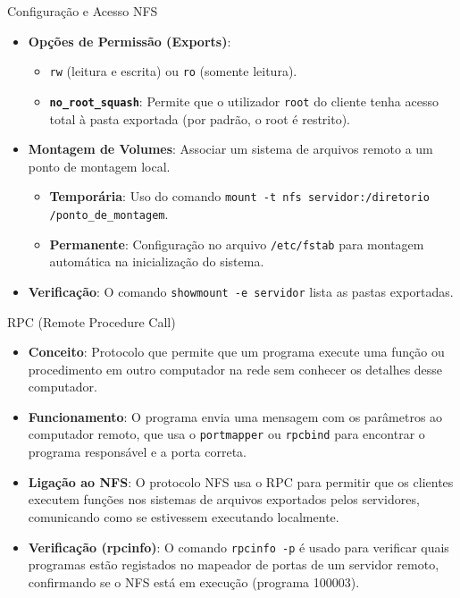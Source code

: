 \documentclass{beamer}
\begin{document}
	\begin{frame}{Configuração e Acesso NFS}
		\begin{itemize}
			\item \textbf{Opções de Permissão (Exports)}:
			\begin{itemize}
				\item \texttt{rw} (leitura e escrita) ou \texttt{ro} (somente leitura).
				\item \textbf{\texttt{no\_root\_squash}}: Permite que o utilizador \texttt{root} do cliente tenha acesso total à pasta exportada (por padrão, o root é restrito).
			\end{itemize}
			\item \textbf{Montagem de Volumes}: Associar um sistema de arquivos remoto a um ponto de montagem local.
			\begin{itemize}
				\item \textbf{Temporária}: Uso do comando \texttt{mount -t nfs servidor:/diretorio /ponto\_de\_montagem}.
				\item \textbf{Permanente}: Configuração no arquivo \texttt{/etc/fstab} para montagem automática na inicialização do sistema.
			\end{itemize}
			\item \textbf{Verificação}: O comando \texttt{showmount -e servidor} lista as pastas exportadas.
		\end{itemize}
	\end{frame}
	
	\begin{frame}{RPC (Remote Procedure Call)}
		\begin{itemize}
			\item \textbf{Conceito}: Protocolo que permite que um programa execute uma função ou procedimento em outro computador na rede sem conhecer os detalhes desse computador.
			\item \textbf{Funcionamento}: O programa envia uma mensagem com os parâmetros ao computador remoto, que usa o \texttt{portmapper} ou \texttt{rpcbind} para encontrar o programa responsável e a porta correta.
			\item \textbf{Ligação ao NFS}: O protocolo NFS usa o RPC para permitir que os clientes executem funções nos sistemas de arquivos exportados pelos servidores, comunicando como se estivessem executando localmente.
			\item \textbf{Verificação (rpcinfo)}: O comando \texttt{rpcinfo -p} é usado para verificar quais programas estão registados no mapeador de portas de um servidor remoto, confirmando se o NFS está em execução (programa 100003).
		\end{itemize}
	\end{frame}
	
\end{document}
